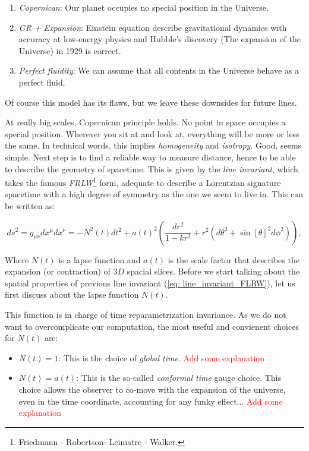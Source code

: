 \documentclass[11pt, a4paper]{article} %
\begin{document}
\begin{enumerate}
	\item \textit{Copernican}: Our planet occupies no special position in the Universe.
	\item \textit{GR + Expansion}: Einstein equation describe gravitational dynamics with accuracy at low-energy physics and Hubble's discovery (The expansion of the Universe) in 1929 is correct.
	\item \textit{Perfect fluidity}: We can assume that all contents in the Universe behave as a perfect fluid.
\end{enumerate}

Of course this model has its flaws, but we leave these downsides for future lines.

At really big scales, Copernican principle holds. No point in space occupies a special position. Wherever you sit at and look at, everything will be more or less the same. In technical words, this implies \textit{homogeneity} and \textit{isotropy}. Good, seems simple. Next step is to find a reliable way to measure distance, hence to be able to describe the geometry of spacetime. This is given by the \textit{line invariant}, which takes the famous \textit{FRLW}\footnote{Friedmann - Robertson- Leimatre - Walker.} form, adequate to describe a Lorentzian signature spacetime with a high degree of symmetry as the one we seem to live in. This can be written as:

\begin{equation}\label{eq: line_invariant_FLRW}
	ds^{2} = g_{\mu \nu} dx^{\mu} dx^{\nu} = - N^{2}(t) dt^{2} + a(t)^2 \left(\frac{dr^{2}}{1- k r^{2}}+ r^{2} \left(d\theta^{2} + \sin[\theta]^{2} d\phi^{2}\right)\right),
\end{equation}

Where $N(t)$ is a lapse function and $a(t)$ is the scale factor that describes the expansion (or contraction) of $3D$ spacial slices. Before we start talking about the spatial properties of previous line invariant (\ref{eq: line_invariant_FLRW}), let us first discuss about the lapse function $N(t)$. 

This function is in charge of time reparametrization invariance. As we do not want to overcomplicate our computation, the most useful and convienent choices for $N(t)$ are:

\begin{itemize}
	\item $N(t) = 1$: This is the choice of \textit{global time}. \textcolor{red}{Add some explanation}
	\item $N(t) = a(t)$: This is the so-called \textit{conformal time} gauge choice. This choice allows the observer to co-move with the expansion of the universe, even in the time coordinate, accounting for any funky effect... \textcolor{red}{Add some explanation}
\end{itemize}
\end{document}
